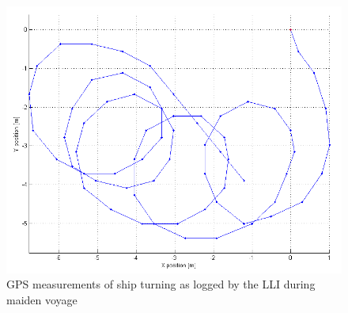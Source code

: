 \begin{figure}[htbp]
	\begin{center}
		\includegraphics[width=\textwidth]{img/maidenVoyage/ship_turning}
		\caption{GPS measurements of ship turning as logged by the LLI during maiden voyage} 
		\label{fig:ship_turning}               
	\end{center}   
\end{figure}

